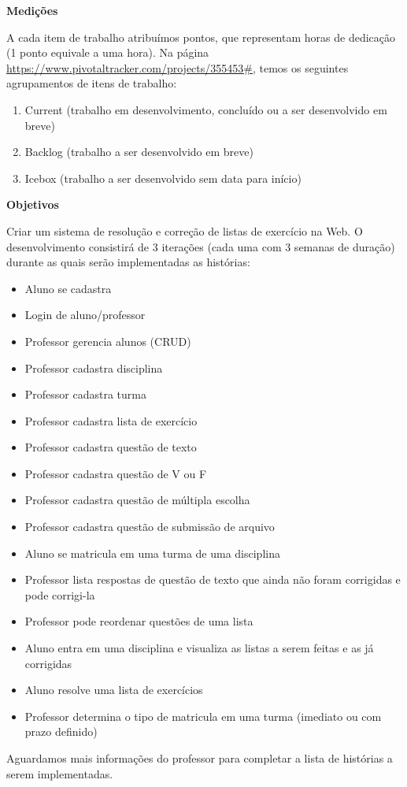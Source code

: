 \documentclass[12pt,letterpaper]{article}
\begin{document}
\vspace{1cm}
{\large {\bf Medições}}
\vspace{0.5cm}

A cada item de trabalho atribuímos pontos, que representam horas de dedicação (1 ponto equivale a uma hora).
Na página \url{https://www.pivotaltracker.com/projects/355453#}, temos os seguintes agrupamentos de itens de trabalho:
\begin{enumerate}
\item{Current (trabalho em desenvolvimento, concluído ou a ser desenvolvido em breve)}
\item{Backlog (trabalho a ser desenvolvido em breve)}
\item{Icebox (trabalho a ser desenvolvido sem data para início)}
\end{enumerate}

\vspace{1cm}
{\large {\bf Objetivos}}
\vspace{0.5cm}

Criar um sistema de resolução e correção de listas de exercício na Web.
O desenvolvimento consistirá de 3 iterações (cada uma com 3 semanas de duração) durante as quais serão implementadas as histórias:

\begin{itemize}
\item{Aluno se cadastra}
\item{Login de aluno/professor}
\item{Professor gerencia alunos (CRUD)}
\item{Professor cadastra disciplina}
\item{Professor cadastra turma}
\item{Professor cadastra lista de exercício}
\item{Professor cadastra questão de texto}
\item{Professor cadastra questão de V ou F}
\item{Professor cadastra questão de múltipla escolha}
\item{Professor cadastra questão de submissão de arquivo}
\item{Aluno se matricula em uma turma de uma disciplina}
\item{Professor lista respostas de questão de texto que ainda não foram corrigidas e pode corrigi-la}
\item{Professor pode reordenar questões de uma lista}
\item{Aluno entra em uma disciplina e visualiza as listas a serem feitas e as já corrigidas}
\item{Aluno resolve uma lista de exercícios}
\item{Professor determina o tipo de matricula em uma turma (imediato ou com prazo definido)}
\end{itemize}
Aguardamos mais informações do professor para completar a lista de histórias a serem implementadas.
\end{document}
